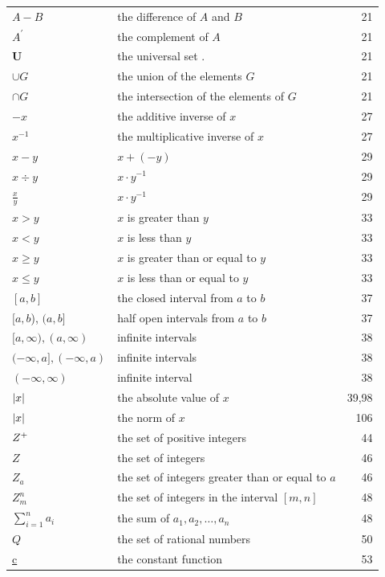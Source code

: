 \newpage
\lhead{}
\begin{tabular}{l l r}
$A-B$& the difference of $A$ and $B$& 21 \\
$A^{'}$& the complement of $A$ &21 \\
\textbf{U} &the universal set .& 21\\
$\cup G$ &the union of the elements $G$& 21\\
$\cap G$ &the intersection of the elements of $G$ &21\\
$-x$ &the additive inverse of $x$& 27 \\
$x^{-1}$ &the multiplicative inverse of $x$& 27\\
$x - y$ &$x + (-y)$ &29\\
$x\div y$& $x\cdot y^{-1}$& 29 \\
$\frac{x}{y}$ &$x\cdot y^{-1}$& 29\\
$x > y$& $x$ is greater than $y$& 33 \\
$x < y$& $x$ is less than $y$& 33 \\
$x \geq y$ &$x$ is greater than or equal to $y$& 33\\
$x \leq y$ &$x$ is less than or equal to $y$& 33\\
$[a,b]$& the closed interval from $a$ to $b$ &37 \\
$[a,b$), $(a,b]$&half open intervals from $a$ to $b$ &37 \\
$[a, \infty ), (a,\infty)$  &infinite intervals &38 \\
$(-\infty , a], (-\infty,a)$&infinite intervals&38\\
$(-\infty , \infty )$&infinite interval&38\\
$\left|x\right|$&the absolute value of $x$ &39,98 \\
$\left|x\right|$& the norm of $x$ &106 \\
$Z^{+}$ &the set of positive integers& 44 \\
$Z$ &the set of integers& 46 \\
$Z_{a}$ &the set of integers greater than or equal to $a$ &46\\
$Z_{m}^{n}$ &the set of integers in the interval $[m,n]$& 48 \\
$\sum_{i=1}^{n}a_{i}$&the sum of $a_{1}, a_{2}, \dots ,a_{n}$ & 48\\
$Q$ &the set of rational numbers& 50 \\
\underline{c}&the constant function &53\\
\end{tabular}

